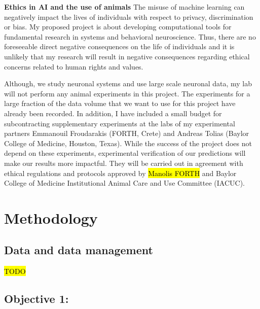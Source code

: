 \documentclass[B2,COG]{ercgrant}
\begin{document}
\textbf{Ethics in AI and the use of animals}
The misuse of machine learning can negatively impact the lives of individuals with respect to privacy, discrimination or bias. 
My proposed project is about developing computational tools for fundamental research in systems and behavioral neuroscience. 
Thus, there are no foreseeable direct negative consequences on the life of individuals and it is unlikely that my research will result in negative consequences regarding ethical concerns related to human rights and values.

Although, we study neuronal systems and use large scale neuronal data, my lab will not perform any animal experiments in this project. 
The experiments for a large fraction of the data volume that we want to use for this project have already been recorded. 
In addition, I have included a small budget for subcontracting supplementary experiments at the labs of my experimental partners Emmanouil Froudarakis (FORTH, Crete) and Andreas Tolias (Baylor College of Medicine, Houston, Texas).  
While the success of the project does not depend on these experiments, experimental verification of our predictions will make our results more impactful. 
They will be carried out in agreement with ethical regulations and protocols approved by \hl{Manolis FORTH} and Baylor College of Medicine Institutional Animal Care and Use Committee (IACUC).
\section{Methodology}
\subsection{Data and data management}
\hl{TODO}

\subsection{\colorbox{obj1}{\color{white}Objective 1}: \oonetitle}
\end{document}
